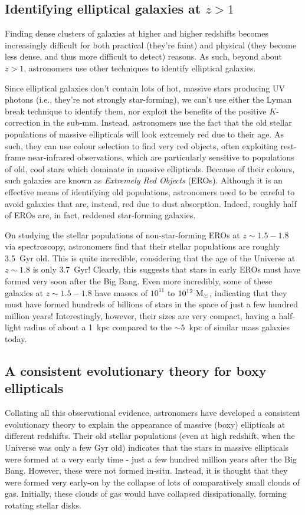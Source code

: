 \documentclass[11pt]{article}
\begin{document}
\subsection{Identifying elliptical galaxies at $z>1$}
Finding dense clusters of galaxies at higher and higher redshifts
becomes increasingly difficult for both practical (they're faint) and
physical (they become less dense, and thus more difficult to detect)
reasons. As such, beyond about $z>1$, astronomers use other techniques
to identify elliptical galaxies.

Since elliptical galaxies don't contain lots of hot, massive stars
producing UV photons (i.e., they're not strongly star-forming), we
can't use either the Lyman break technique to identify them, nor
exploit the benefits of the positive $K$-correction in the sub-mm.
Instead, astronomers use the fact that the old stellar populations of
massive ellipticals will look extremely red due to their age. As such,
they can use colour selection to find very red objects, often
exploiting rest-frame near-infrared observations, which are
particularly sensitive to populations of old, cool stars which
dominate in massive ellipticals. Because of their colours, such
galaxies are known as {\it Extremely Red Objects} (EROs). Although it
is an effective means of identifying old populations, astronomers need
to be careful to avoid galaxies that are, instead, red due to dust
absorption. Indeed, roughly half of EROs are, in fact, reddened
star-forming galaxies.

On studying the stellar populations of non-star-forming EROs at
$z\sim1.5-1.8$ via spectroscopy, astronomers find that their stellar
populations are roughly 3.5~Gyr old. This is quite incredible,
considering that the age of the Universe at $z\sim1.8$ is only
3.7~Gyr! Clearly, this suggests that stars in early EROs must have
formed very soon after the Big Bang. Even more incredibly, some of
these galaxies at $z\sim1.5-1.8$ have masses of $10^{11}$ to
$10^{12}~{\rm M_\odot}$, indicating that they must have formed hundreds of
billions of stars in the space of just a few hundred million years!
Interestingly, however, their sizes are very compact, having a
half-light radius of about a 1~kpc compared to the $\sim5$~kpc of
similar mass galaxies today.

\subsection{A consistent evolutionary theory for boxy ellipticals}
Collating all this observational evidence, astronomers have developed
a consistent evolutionary theory to explain the appearance of massive
(boxy) ellipticals at different redshifts. Their old stellar
populations (even at high redshift, when the Universe was only a few
Gyr old) indicates that the stars in massive ellipticals were formed
at a very early time - just a few hundred million years after the Big
Bang. However, these were not formed in-situ. Instead, it is thought
that they were formed very early-on by the collapse of lots of
comparatively small clouds of gas. Initially, these clouds of gas
would have collapsed dissipationally, forming rotating stellar
disks.
\end{document}
